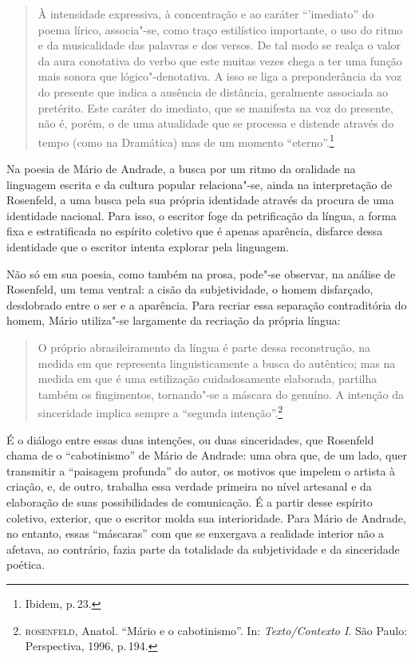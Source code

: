 \begin{quote}
À intensidade expressiva, à concentração e ao caráter ``'imediato'' do poema lírico, associa"-se, como traço estilístico importante, o uso do ritmo e da musicalidade das palavras e dos versos. De tal modo se realça o valor da aura conotativa do verbo que este muitas vezes chega a ter uma função mais sonora que lógico"-denotativa. A isso se liga a preponderância da voz do presente que indica a ausência de distância, geralmente associada ao pretérito. Este caráter do imediato, que se manifesta na voz do presente, não é, porém, o de uma atualidade que se processa e distende através do tempo (como na Dramática) mas de um momento ``eterno''.\footnote{Ibidem, p.\,23.}
\end{quote}

Na poesia de Mário de Andrade, a busca por um ritmo da oralidade na linguagem escrita e da cultura popular relaciona"-se, ainda na interpretação de Rosenfeld, a uma busca pela sua própria identidade através da procura de uma identidade nacional. Para isso, o escritor foge da petrificação da língua, a forma fixa e estratificada no espírito coletivo que é apenas aparência, disfarce dessa identidade que o escritor intenta explorar pela linguagem.

Não só em sua poesia, como também na prosa, pode"-se observar, na análise de Rosenfeld, um tema ventral: a cisão da subjetividade, o homem disfarçado, desdobrado entre o ser e a aparência. Para recriar essa separação contraditória do homem, Mário utiliza"-se largamente da recriação da própria língua:

\begin{quote}
O próprio abrasileiramento da língua é parte dessa reconstrução, na medida em que representa linguisticamente a busca do autêntico; mas na medida em que é uma estilização cuidadosamente elaborada, partilha também os fingimentos, tornando"-se a máscara do genuíno. A intenção da sinceridade implica sempre a ``segunda intenção''.\footnote{\textsc{rosenfeld}, Anatol. ``Mário e o cabotinismo''. In: \textit{Texto/Contexto I}. São Paulo: Perspectiva, 1996, p.\,194.}
\end{quote}

É o diálogo entre essas duas intenções, ou duas sinceridades, que Rosenfeld chama de o ``cabotinismo'' de Mário de Andrade: uma obra que, de um lado, quer transmitir a ``paisagem profunda'' do autor, os motivos que impelem o artista à criação, e, de outro, trabalha essa verdade primeira no nível artesanal e da elaboração de suas possibilidades de comunicação. É a partir desse espírito coletivo, exterior,
que o escritor molda sua interioridade. Para Mário de Andrade, no entanto, essas ``máscaras'' com que se enxergava a realidade interior não a afetava, ao contrário, fazia parte da totalidade da subjetividade e da sinceridade poética.

